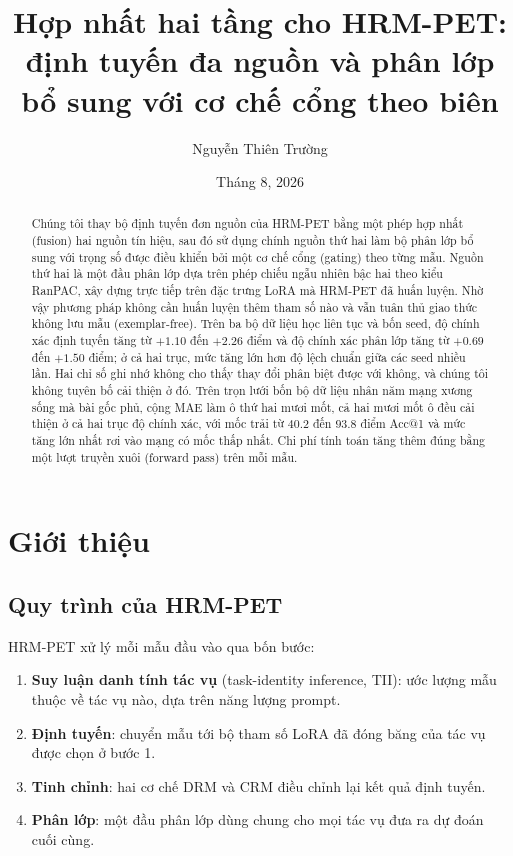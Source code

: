 \documentclass[11pt,a4paper]{article}
\title{\bfseries Hợp nhất hai tầng cho HRM-PET:\\
định tuyến đa nguồn và phân lớp bổ sung với cơ chế cổng theo biên}
\author{Nguyễn Thiên Trường}
\date{Tháng 8, 2026}
\begin{document}
\maketitle

\begin{abstract}
Chúng tôi thay bộ định tuyến đơn nguồn của HRM-PET bằng một phép hợp nhất
(fusion) hai nguồn tín hiệu, sau đó sử dụng chính nguồn thứ hai làm bộ phân lớp
bổ sung với trọng số được điều khiển bởi một cơ chế cổng (gating) theo từng mẫu.
Nguồn thứ hai là một đầu phân lớp dựa trên phép chiếu ngẫu nhiên bậc hai theo
kiểu RanPAC, xây dựng trực tiếp trên đặc trưng LoRA mà HRM-PET đã huấn luyện.
Nhờ vậy phương pháp không cần huấn luyện thêm tham số nào và vẫn tuân thủ giao
thức không lưu mẫu (exemplar-free). Trên ba bộ dữ liệu học liên tục và bốn seed,
độ chính xác định tuyến tăng từ $+1.10$ đến $+2.26$ điểm và độ chính xác phân
lớp tăng từ $+0.69$ đến $+1.50$ điểm; ở cả hai trục, mức tăng lớn hơn độ lệch
chuẩn giữa các seed nhiều lần. Hai chỉ số ghi nhớ không cho thấy thay đổi phân
biệt được với không, và chúng tôi không tuyên bố cải thiện ở đó. Trên trọn lưới bốn bộ dữ liệu nhân năm mạng
xương sống mà bài gốc phủ, cộng MAE làm ô thứ hai mươi mốt, cả hai mươi mốt
ô đều cải thiện ở cả hai trục độ chính xác, với mốc trải từ $40.2$ đến $93.8$
điểm Acc@1 và mức tăng lớn nhất rơi vào mạng có mốc thấp nhất. Chi phí tính toán tăng thêm đúng bằng một lượt truyền xuôi (forward pass)
trên mỗi mẫu.
\end{abstract}

\tableofcontents
\bigskip

\section{Giới thiệu}

\subsection{Quy trình của HRM-PET}

HRM-PET xử lý mỗi mẫu đầu vào qua bốn bước:

\begin{enumerate}[leftmargin=*, itemsep=2pt]
\item \textbf{Suy luận danh tính tác vụ} (task-identity inference, TII): ước
      lượng mẫu thuộc về tác vụ nào, dựa trên năng lượng prompt.
\item \textbf{Định tuyến}: chuyển mẫu tới bộ tham số LoRA đã đóng băng của tác
      vụ được chọn ở bước 1.
\item \textbf{Tinh chỉnh}: hai cơ chế DRM và CRM điều chỉnh lại kết quả định
      tuyến.
\item \textbf{Phân lớp}: một đầu phân lớp dùng chung cho mọi tác vụ đưa ra dự
      đoán cuối cùng.
\end{enumerate}
\end{document}
